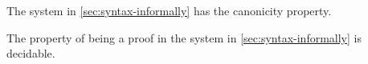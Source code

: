\documentclass[hott-all.tex]{subfiles}
\begin{document}
%
\begin{cor}
 The system in \cref{sec:syntax-informally} has the canonicity property.
\end{cor}
%
%
\begin{cor}
The property of being a proof in the system in \cref{sec:syntax-informally} is decidable.
\end{cor}
%
%
%
%
%
%
%
%
\end{document}
